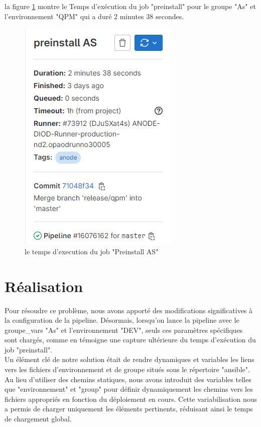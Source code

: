 {la figure \ref{figtemps} montre le Temps d'exécution du job "preinstall" pour le groupe "As" et l'environnement "QPM" qui a duré 2 minutes 38 secondes.
\begin{figure}[htbp]
     \centering
  \includegraphics[scale=0.7]{img/master scribe.png}
        \caption{le temps d'execution du job "Preinstall AS"} 
  \label{figtemps}
 \end{figure}
\section{Réalisation}
Pour résoudre ce problème, nous avons apporté des modifications significatives à la configuration de la pipeline. Désormais, lorsqu'on lance la pipeline avec le groupe\_vars "As" et l'environnement "DEV", seuls ces paramètres spécifiques sont chargés, comme en témoigne une capture ultérieure du temps d'exécution du job "preinstall".\\

Un élément clé de notre solution était de rendre dynamiques et variables les liens vers les fichiers d'environnement et de groupe situés sous le répertoire "ansible". Au lieu d'utiliser des chemins statiques, nous avons introduit des variables telles que "environnement" et "group" pour définir dynamiquement les chemins vers les fichiers appropriés en fonction du déploiement en cours. Cette variabilisation nous a permis de charger uniquement les éléments pertinents, réduisant ainsi le temps de chargement global.

}
